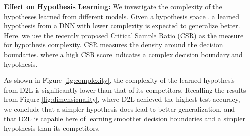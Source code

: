 \documentclass{article}
\begin{document}
\textbf{Effect on Hypothesis Learning:}
\label{sec:complexity}
We investigate the complexity of the hypotheses learned from different models. Given a hypothesis space , a learned hypothesis  from a DNN with lower complexity is expected to generalize better. 
Here, we use the recently proposed Critical Sample Ratio (CSR) \cite{arpit2017closer} as the measure for hypothesis complexity. CSR measures the density around the decision boundaries, where a high CSR score indicates a complex decision boundary and hypothesis.

As shown in Figure \ref{fig:complexity}, the complexity of the learned hypothesis from D2L is significantly lower than that of its competitors. Recalling the results from Figure \ref{fig:dimensionality}, where D2L achieved the highest test accuracy, we conclude that a simpler hypothesis does lead to better generalization, and that D2L is capable here of learning smoother decision boundaries and a simpler hypothesis than its competitors.
\end{document}
